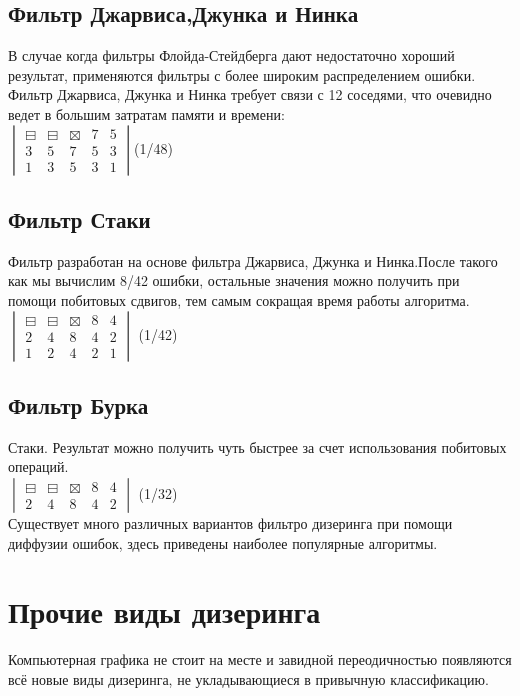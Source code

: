 \subsection{Фильтр Джарвиса,Джунка и Нинка}
В случае когда фильтры Флойда-Стейдберга дают недостаточно хороший результат, применяются фильтры с более широким распределением ошибки. Фильтр Джарвиса, Джунка и Нинка требует связи с 12 соседями, что очевидно ведет в большим затратам памяти и времени\cite{Dh}:\\
$\begin{vmatrix}
\boxminus & \boxminus & \boxtimes & 7 & 5\\
3 & 5 & 7 & 5 &3 \\
1 & 3 & 5 & 3 & 1 
\end{vmatrix}$(1/48)

\subsection{Фильтр Стаки}
Фильтр разработан на основе фильтра Джарвиса, Джунка и Нинка.После такого как мы вычислим 8/42 ошибки, остальные значения можно получить при помощи побитовых сдвигов, тем самым сокращая время работы алгоритма.\\
$\begin{vmatrix}
\boxminus & \boxminus & \boxtimes & 8 & 4 \\
2 & 4 & 8 & 4 & 2 \\
1 & 2 & 4 & 2 & 1

\end{vmatrix}$ (1/42)

\subsection{Фильтр Бурка}
Стаки. Результат можно получить чуть быстрее за счет использования побитовых операций.\\
$\begin{vmatrix}
\boxminus &  \boxminus & \boxtimes  & 8 & 4\\
2 & 4 & 8 & 4 & 2
\end{vmatrix}$ (1/32)\\
Существует много различных вариантов фильтро дизеринга при помощи диффузии ошибок, здесь приведены наиболее  популярные алгоритмы.\cite{Dh}
\section{Прочие виды дизеринга}
Компьютерная графика не стоит на месте и завидной переодичностью появляются всё новые виды дизеринга, не укладывающиеся в привычную классификацию.
